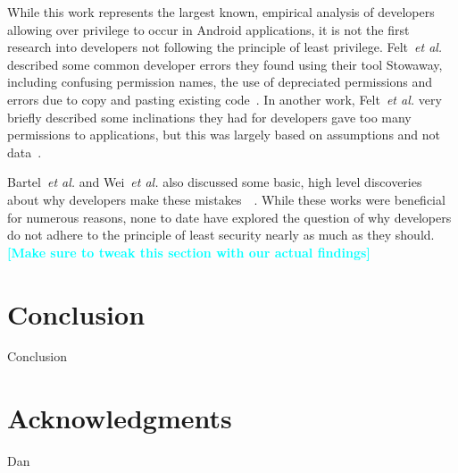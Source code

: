 \documentclass{sig-alternate}
\newcommand{\todo}[1]{\textcolor{cyan}{\textbf{[#1]}}}
\begin{document}
While this work represents the largest known, empirical analysis of developers allowing over privilege to occur in Android applications, it is not the first research into developers not following the principle of least privilege. Felt~\emph{et al.} described some common developer errors they found using their tool Stowaway, including confusing permission names, the use of depreciated permissions and errors due to copy and pasting existing code~\cite{Felt:2011:APD:2046707.2046779}. In another work,  Felt~\emph{et al.} very briefly described some inclinations they had for developers gave too many permissions to applications, but this was largely based on assumptions and not data~\cite{Felt:2011:EAP:2002168.2002175}.


Bartel~\emph{et al.} and Wei~\emph{et al.} also discussed some basic, high level discoveries about why developers make these mistakes~\cite{Bartel:2012:ASP:2351676.2351722}~\cite{Wei:2012:PEA:2420950.2420956}. While these works were beneficial for numerous reasons, none to date have explored the question of why developers do not adhere to the principle of least security nearly as much as they should.
\todo{Make sure to tweak this section with our actual findings}








\section{Conclusion}
\label{sec: conclusion}

Conclusion



\section{Acknowledgments}
Dan





\end{document}
